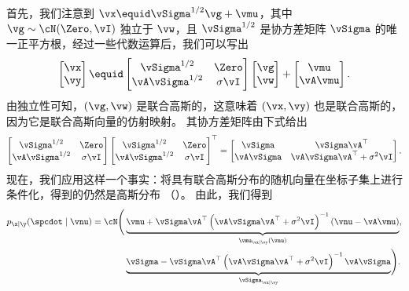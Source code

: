 \documentclass[../../book-main_zh.tex]{subfiles}
\begin{document}
\begin{example}
    首先，我们注意到 $\vx \equid \vSigma^{1/2} \vg + \vmu$，其中 $\vg \sim
    \cN(\Zero, \vI)$ 独立于 $\vw$，且 $\vSigma^{1/2}$ 是协方差矩阵 $\vSigma$ 的唯一正平方根，经过一些代数运算后，我们可以写出
    \begin{equation*}
        \begin{bmatrix}
            \vx \\
            \vy
        \end{bmatrix}
        \equid
        \begin{bmatrix}
            \vSigma^{1/2} & \Zero \\
            \vA \vSigma^{1/2} & \sigma \vI
        \end{bmatrix}
        \begin{bmatrix}
            \vg \\
            \vw
        \end{bmatrix}
        +
        \begin{bmatrix}
            \vmu \\
            \vA\vmu
        \end{bmatrix}.
    \end{equation*}
    由独立性可知，$(\vg, \vw)$ 是联合高斯的，这意味着
    $(\vx, \vy)$ 也是联合高斯的，因为它是联合高斯向量的仿射映射。
    其协方差矩阵由下式给出
    \begin{equation*}
        \begin{bmatrix}
            \vSigma^{1/2} & \Zero \\
            \vA \vSigma^{1/2} & \sigma \vI
        \end{bmatrix}
        \begin{bmatrix}
            \vSigma^{1/2} & \Zero \\
            \vA \vSigma^{1/2} & \sigma \vI
        \end{bmatrix}^\top
        =
        \begin{bmatrix}
            \vSigma & \vSigma \vA^\top \\
            \vA \vSigma & \vA \vSigma \vA^\top + \sigma^2 \vI
        \end{bmatrix}.
    \end{equation*}
    现在，我们应用这样一个事实：将具有联合高斯分布的随机向量在坐标子集上进行条件化，得到的仍然是高斯分布
    （）。
    由此，我们得到
    \begin{equation}
        \begin{split}
            p_{\x \mid \y}(\spcdot \mid \vnu) = \cN\Biggl(
                &\underbrace{%
                    \vmu + \vSigma\vA^\top \left(\vA\vSigma\vA^\top +
                    \sigma^2 \vI\right)^{-1}
                (\vnu - \vA\vmu)}_{\vmu_{\vx \mid \vy}(\vnu)}, \\
                &\underbrace{%
                    \vSigma - \vSigma \vA^\top
                    \left(\vA\vSigma\vA^\top + \sigma^2
                \vI\right)^{-1} \vA \vSigma}_{\vSigma_{\vx\mid \vy}}
            \Biggr).
        \end{split}
    \end{equation}


\end{example}
\end{document}
